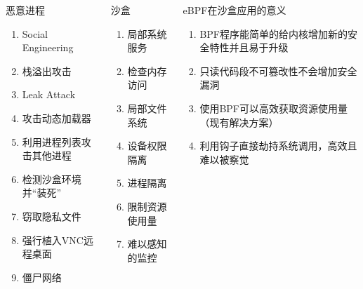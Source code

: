\documentclass[UTF8,aspectratio=169,fontset=macnew,xcolor=table]{ctexbeamer}
\begin{document}
\begin{frame}
    \begin{columns}
        \begin{column}{0.3\textwidth}
            \begin{block}{恶意进程}
                \begin{enumerate}
                    \item Social Engineering
                    \item 栈溢出攻击
                    \item Leak Attack
                    \item 攻击动态加载器
                    \item 利用进程列表攻击其他进程
                    \item 检测沙盒环境并“装死”
                    \item 窃取隐私文件
                    \item 强行植入VNC远程桌面
                    \item 僵尸网络
                \end{enumerate}
            \end{block}
        \end{column}
    
        \begin{column}{0.3\textwidth}
            \begin{block}{沙盒}
                \begin{enumerate}
                    \item 局部系统服务
                    \item 检查内存访问
                    \item 局部文件系统
                    \item 设备权限隔离
                    \item 进程隔离
                    \item 限制资源使用量
                    \item 难以感知的监控
                \end{enumerate}
            \end{block}
        \end{column}

        \begin{column}{0.3\textwidth}
            \begin{block}{eBPF在沙盒应用的意义}
                \begin{enumerate}
                    \item BPF程序能简单的给内核增加新的安全特性并且易于升级
                    \item 只读代码段不可篡改性不会增加安全漏洞
                    \item 使用BPF可以高效获取资源使用量（现有解决方案）
                    \item 利用钩子直接劫持系统调用，高效且难以被察觉
                \end{enumerate}
            \end{block}
        \end{column}
    \end{columns}
\end{frame}
\end{document}
